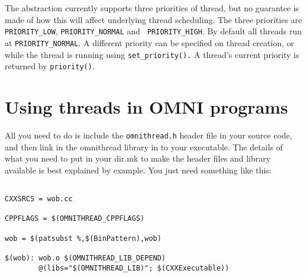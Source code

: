 \documentclass[11pt,twoside,onecolumn]{article}
\begin{document}

The abstraction currently supports three priorities of thread, but no guarantee
is made of how this will affect underlying thread scheduling.  The three
priorities are {\tt PRIORITY\_LOW}, {\tt PRIORITY\_NORMAL} and {\tt
PRIORITY\_HIGH}.  By default all threads run at {\tt PRIORITY\_NORMAL}.  A
different priority can be specified on thread creation, or while the thread is
running using {\tt set\_priority().}  A thread's current priority is returned
by {\tt priority()}.


\section{Using threads in OMNI programs}

All you need to do is include the {\tt omnithread.h} header file in your source
code, and then link in the omnithread library in to your executable.  The
details of what you need to put in your dir.mk to make the header files and
library available is best explained by example.  You just need something like
this:

\begin{verbatim}

CXXSRCS = wob.cc

CPPFLAGS = $(OMNITHREAD_CPPFLAGS)

wob = $(patsubst %,$(BinPattern),wob)

$(wob): wob.o $(OMNITHREAD_LIB_DEPEND)
        @(libs="$(OMNITHREAD_LIB)"; $(CXXExecutable))

\end{verbatim}
\end{document}
